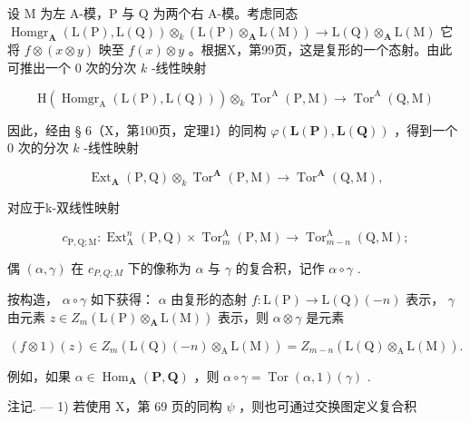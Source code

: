 设 M 为左 A-模，P 与 Q 为两个右 A-模。考虑同态 \(\operatorname{Homgr}_{\mathbf{A}}(\mathrm{L}(\mathrm{P}), \mathrm{L}(\mathrm{Q})) \otimes_{k} (\mathrm{L}(\mathrm{P}) \otimes_{\mathbf{A}} \mathrm{L}(\mathrm{M})) \to \mathrm{L}(\mathrm{Q}) \otimes_{\mathbf{A}} \mathrm{L}(\mathrm{M})\) 它将 \(f \otimes (x \otimes y)\) 映至 \(f(x) \otimes y\) 。根据X，第99页，这是复形的一个态射。由此可推出一个 0 次的分次 \(k\) -线性映射

\[
\mathrm{H} (\operatorname{Homgr} _ {\mathrm{A}} (\mathrm{L} (\mathrm{P}), \mathrm{L} (\mathrm{Q}))) \otimes_ {k} \operatorname{Tor} ^ {\mathrm{A}} (\mathrm{P}, \mathrm{M}) \rightarrow \operatorname{Tor} ^ {\mathrm{A}} (\mathrm{Q}, \mathrm{M})
\]

因此，经由 § 6（X，第100页，定理1）的同构 \(\varphi(\mathbf{L}(\mathbf{P}),\mathbf{L}(\mathbf{Q}))\) ，得到一个 0 次的分次 \(k\) -线性映射

\[
\operatorname{Ext} _ {\mathbf {A}} (\mathrm{P}, \mathrm{Q}) \otimes_ {k} \operatorname{Tor} ^ {\mathbf {A}} (\mathrm{P}, \mathrm{M}) \rightarrow \operatorname{Tor} ^ {\mathbf {A}} (\mathrm{Q}, \mathrm{M}),\tag{10}
\]

对应于k-双线性映射

\[
c _ {\mathrm{P}, \mathrm{Q}; \mathrm{M}}: \operatorname{Ext} _ {\mathrm{A}} ^ {n} (\mathrm{P}, \mathrm{Q}) \times \operatorname{Tor} _ {m} ^ {\mathrm{A}} (\mathrm{P}, \mathrm{M}) \rightarrow \operatorname{Tor} _ {m - n} ^ {\mathrm{A}} (\mathrm{Q}, \mathrm{M});\tag{11}
\]

偶 \((\alpha, \gamma)\) 在 \(c_{P,Q;M}\) 下的像称为 \(\alpha\) 与 \(\gamma\) 的复合积，记作 \(\alpha \circ \gamma\) .

按构造， \(\alpha \circ \gamma\) 如下获得： \(\alpha\) 由复形的态射 \(f: \mathrm{L}(\mathrm{P}) \to \mathrm{L}(\mathrm{Q})(-n)\) 表示， \(\gamma\) 由元素 \(z \in Z_m(\mathrm{L}(\mathrm{P}) \otimes_{\mathbf{A}} \mathrm{L}(\mathrm{M}))\) 表示，则 \(\alpha \otimes \gamma\) 是元素

\[
(f \otimes 1) (z) \in Z _ {m} (\mathrm{L} (\mathrm{Q}) (- n) \otimes_ {\mathrm{A}} \mathrm{L} (\mathrm{M})) = Z _ {m - n} (\mathrm{L} (\mathrm{Q}) \otimes_ {\mathrm{A}} \mathrm{L} (\mathrm{M})).
\]

例如，如果 \(\alpha \in \operatorname{Hom}_{\mathbf{A}}(\mathbf{P},\mathbf{Q})\) ，则 \(\alpha \circ \gamma = \operatorname{Tor}(\alpha,1)(\gamma)\) .

注记. --- 1) 若使用 X，第 69 页的同构 \(\psi\) ，则也可通过交换图定义复合积

